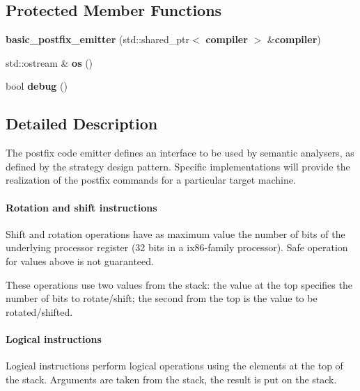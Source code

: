 \subsection*{Protected Member Functions}
\begin{DoxyCompactItemize}
\item 
{\bfseries basic\+\_\+postfix\+\_\+emitter} (std\+::shared\+\_\+ptr$<$ {\bf compiler} $>$ \&{\bf compiler})\label{classcdk_1_1basic__postfix__emitter_acaf970d10f218a088bd57ca6bcadce35}

\item 
std\+::ostream \& {\bfseries os} ()\label{classcdk_1_1basic__postfix__emitter_a34b69125c2b35e846461de6328894166}

\item 
bool {\bfseries debug} ()\label{classcdk_1_1basic__postfix__emitter_ab8a379fd593474bc165f8187d831affd}

\end{DoxyCompactItemize}


\subsection{Detailed Description}
The postfix code emitter defines an interface to be used by semantic analysers, as defined by the strategy design pattern. Specific implementations will provide the realization of the postfix commands for a particular target machine.

\paragraph*{Rotation and shift instructions}

Shift and rotation operations have as maximum value the number of bits of the underlying processor register (32 bits in a ix86-\/family processor). Safe operation for values above is not guaranteed.

These operations use two values from the stack\+: the value at the top specifies the number of bits to rotate/shift; the second from the top is the value to be rotated/shifted.

\paragraph*{Logical instructions}

Logical instructions perform logical operations using the elements at the top of the stack. Arguments are taken from the stack, the result is put on the stack.

